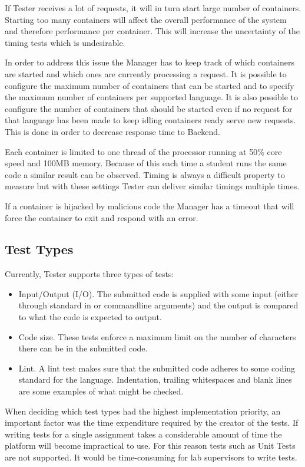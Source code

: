 If Tester receives a lot of requests, it will in turn start large number of containers. Starting too many containers will affect the overall performance of the system and therefore performance per container. This will increase the uncertainty of the timing tests which is undesirable.

In order to address this issue the Manager has to keep track of which containers are started and which ones are currently processing a request. It is possible to configure the maximum number of containers that can be started and to specify the maximum number of containers per supported language. It is also possible to configure the number of containers that should be started even if no request for that language has been made to keep idling containers ready serve new requests. This is done in order to decrease response time to Backend.

Each container is limited to one thread of the processor running at 50\% core speed and 100MB memory. Because of this each time a student runs the same code a similar result can be observed. Timing is always a difficult property to measure but with these settings Tester can deliver similar timings multiple times.

If a container is hijacked by malicious code the Manager has a timeout that will force the container to exit and respond with an error.

\subsection{Test Types}\label{sec:testtypes}
Currently, Tester supports three types of tests:
\begin{itemize}
\item Input/Output (I/O). The submitted code is supplied with some input (either through standard in or commandline arguments) and the output is compared to what the code is expected to output.
\item Code size. These tests enforce a maximum limit on the number of characters there can be in the submitted code.
\item Lint. A lint test makes sure that the submitted code adheres to some coding standard for the language. Indentation, trailing whitespaces and blank lines are some examples of what might be checked.
\end{itemize}
When deciding which test types had the highest implementation priority, an important factor was the time expenditure required by the creator of the tests. If writing tests for a single assignment takes a considerable amount of time the platform will become impractical to use. For this reason tests such as Unit Tests are not supported. It would be time-consuming for lab supervisors to write tests.

